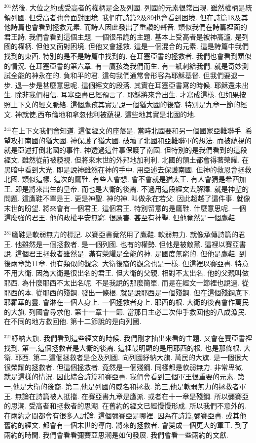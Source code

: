 \documentclass{book}
\begin{document}
$^{201}$然後.
大位之約或受高者的權柄是企及列國.
列國的元素很常出現.
雖然權柄是統領列國.
但受高者也會面對困境.
我們在詩篇2及89也會看到困境.
但在詩篇18及其他詩篇也會看到拯救元素.
而詩人因此發出了重讚的聲音.
類似我們在詩篇裡面的君王詩.
我們會看到這個主題.
一個很吊詭的主題.
基本上受高者是被神高瀘.
是列國的權柄.
但他又面對困境.
但他又會拯救.
這是一個混合的元素.
這是詩篇中我們找到的東西.
特別的是不是詩篇中找到的.
在耳塞亞書的拯救者.
我們也會看到類似的情況.
在耳塞亞書的第六章.
有一鷹孩為我們而生.
有一紙刺給我們.
就是奇妙測試全能的神永在的.
負和平的君.
這句我們通常會形容為耶穌基督.
但我們要退一步.
退一步是甚麼意思呢.
這個經文的段落.
其實在耳塞亞書寫的時候.
耶穌還未出生.
除非我們相信.
耳塞亞書已經預言了.
耶穌將來會出生.
才寫成這樣.
但如果按照上下文的經文脈絡.
這個鷹孩其實是說一個猶大國的後裔.
特別是九章一節的經文.
神就使,西布倫地和拿忽他利被藐視.
這些地其實是北國的地.

$^{241}$在上下文我們會知道.
這個經文的座落是.
當時北國要和另一個國家亞難聯手.
希望攻打南國的猶大國.
神保護了猶大國.
破壞了北國和亞難聯軍的想法.
而被藐視的就是亞述打倒北國的事件.
神透過這件事保護了南國.
但特別的是我們看到的這段經文.
雖然從前被藐視.
但將來末世的外邦地加利利.
北國的領土都會得著榮耀.
在黑暗中看到大光.
即是說神雖然在神的手中.
用亞述去保護南國.
但神的救恩會拯救北國.
類似這樣.
這次的鷹鞋.
有些人會想.
會不會就是猶太王.
有人會猜是希西加王.
即是將來出生的皇帝.
而也是大衛的後裔.
不過用這段經文去解釋.
就是神聖的問題.
這鷹鞋不單是王.
更是神聖.
神的神.
叫做永在若父.
因此超越了這件事.
就像末世的盼望.
將來會有一個君王.
這個君王.
特別留意的是鷹鞋.
什麼意思呢.
一個這麼強的君王.
他的政權平安無窮.
很厲害.
甚至有神聖.
但他竟然是一個鷹鞋.

$^{281}$鷹鞋是軟弱無力的標記.
以賽亞書竟然用了鷹鞋.
軟弱無力.
就像承傳詩篇的君王.
他雖然是一個拯救者.
是一個列國.
也有的權勢.
但他是被敵黨.
這裡以賽亞書說.
這個君王拯救者雖然是.
滿有榮耀是全能的神.
是國度無窮的.
但他是鷹鞋.
到後兩章第11章.
也有類似的觀念.
大衛後裔的觀念也是一樣.
但這裡以賽亞書.
特意不用大衛.
因為大衛是很出名的君王.
但大衛的父親.
相對不太出名.
他的父親叫做耶西.
為什麼耶西不太出名呢.
不是我說的那麼簡單.
而是在經文一節裡也說過.
從耶西的本.
從耶西的殘鋼.
發出一條根.
就是說耶西是一個殘鋼.
但在這個殘鋼底下.
耶羅華的靈.
會淋在一個人身上.
一個拯救者身上.
耶西的根.
大衛的後裔會作萬民的大旗.
列國會尋求他.
第十一章十一節.
當那日主必二次伸手救回他的八成漁民.
在不同的地方救回他.
第十二節說的是向列國.

$^{321}$紓納大旗.
我們看到這些經文的時候.
我們剛才抽出來看的主題.
又會在賽亞書裡找到.
第一,這個拯救者是大衛的後裔.
這裡最明顯的是用耶西的根.
也是那條根.
大衛.
耶西.
第二,這個拯救者是企及列國.
向列國紓納大旗.
萬民的大旗.
是一個很大很榮耀的拯救者.
但這個拯救者.
竟然是一個殘鋼.
同樣都是軟弱無力.
非常卑微.
就是這樣的情況.
因此綜合詩篇和賽亞書.
我們會看到三個軍王很重要的元素.
第一,他是大衛的後裔.
第二,他是列國的威名和拯救.
第三,他是軟弱無力的拯救者軍王.
無論在詩篇被人抵擋.
在賽亞書九章是鷹派.
或者在十一章是殘鋼.
所以彌賽亞的思潮.
受高者和拯救者的思潮.
在舊約的經文已經慢慢形成.
所以我們不意外的.
在兩約之間都會有很多人討論.
這個彌賽亞是哪裡.
因為在詩篇,彌賽亞書.
或其他舊約的經文.
都會有一個末世的導向.
將來的拯救者.
會變成一個更大的軍王.
到了兩約的時間.
我們會看看彌賽亞思潮是如何發展.
我們會看一些兩約的文獻.
\end{document}
